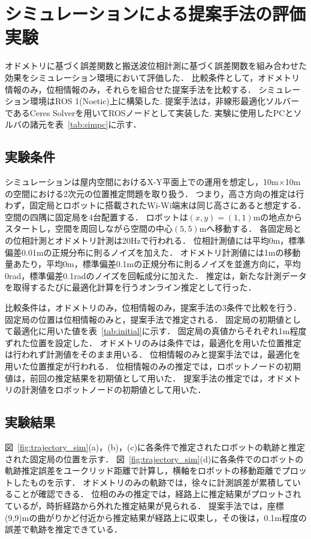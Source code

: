 \documentclass[a4jsme]{jsmepaper}
\newcommand\figref[1]{図~\ref{fig:#1}}
\newcommand\tabref[1]{表~\ref{tab:#1}}
\begin{document}
\section{シミュレーションによる提案手法の評価実験}
オドメトリに基づく誤差関数と搬送波位相計測に基づく誤差関数を組み合わせた効果をシミュレーション環境において評価した．
比較条件として，オドメトリ情報のみ，位相情報のみ，それらを組合せた提案手法を比較する．
シミュレーション環境はROS 1(Noetic)上に構築した.
提案手法は，非線形最適化ソルバーであるCeres Solver\cite{ceres-solver}を用いてROSノードとして実装した.
実験に使用したPCとソルバの諸元を\tabref{simpc}に示す．



\subsection{実験条件}
シミュレーションは屋内空間におけるX-Y平面上での運用を想定し，10m$\times$10mの空間における2次元の位置推定問題を取り扱う．
つまり，高さ方向の推定は行わず，固定局とロボットに搭載されたWi-Wi端末は同じ高さにあると想定する．
空間の四隅に固定局を4台配置する．
ロボットは$(x,y)=(1,1)$mの地点からスタートし，空間を周回しながら空間の中心$(5,5)$mへ移動する．
各固定局との位相計測とオドメトリ計測は20Hzで行われる．
位相計測値には平均0m，標準偏差0.01mの正規分布に則るノイズを加えた．
オドメトリ計測値には1mの移動量あたり，平均0m，標準偏差0.1mの正規分布に則るノイズを並進方向に，平均0rad，標準偏差0.1radのノイズを回転成分に加えた．
推定は，新たな計測データを取得するたびに最適化計算を行うオンライン推定として行った．

比較条件は，オドメトリのみ，位相情報のみ，提案手法の3条件で比較を行う．
固定局の位置は位相情報のみと，提案手法で推定される．
固定局の初期値として最適化に用いた値を\tabref{initial}に示す．
固定局の真値からそれぞれ1m程度ずれた位置を設定した．
オドメトリのみは条件では，最適化を用いた位置推定は行われず計測値をそのまま用いる．
位相情報のみと提案手法では，最適化を用いた位置推定が行われる．
位相情報のみの推定では，ロボットノードの初期値は，前回の推定結果を初期値として用いた．
提案手法の推定では，オドメトリの計測値をロボットノードの初期値として用いた．


\subsection{実験結果}
\figref{trajectory_sim}(a)，(b)，(c)に各条件で推定されたロボットの軌跡と推定された固定局の位置を示す．
\figref{trajectory_sim}(d)に各条件でのロボットの軌跡推定誤差をユークリッド距離で計算し，横軸をロボットの移動距離でプロットしたものを示す．
オドメトリのみの軌跡では，徐々に計測誤差が累積していることが確認できる．
位相のみの推定では，経路上に推定結果がプロットされているが，時折経路から外れた推定結果が見られる．
提案手法では，座標(9,9)mの曲がりかど付近から推定結果が経路上に収束し，その後は，0.1m程度の誤差で軌跡を推定できている．
\end{document}

